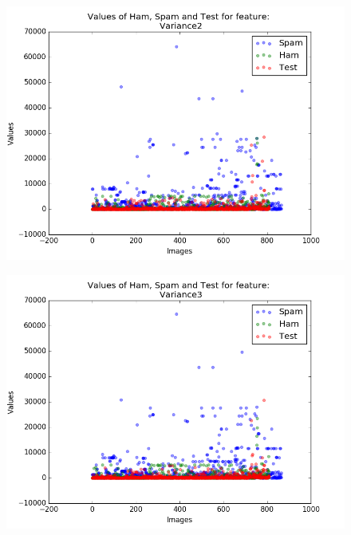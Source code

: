 \begin{figure}[h]
	\centering
	\begin{minipage}{.5\textwidth}
		\centering
		\includegraphics[width=\linewidth]{images/appA/Variance2_values_scatter}
		\label{fig:Variance2_values_scatter}
	\end{minipage}%
	\begin{minipage}{.5\textwidth}
		\centering
		\includegraphics[width=\linewidth]{images/appA/Variance3_values_scatter}
		\label{fig:Variance3_values_scatter}
	\end{minipage}
\end{figure}


